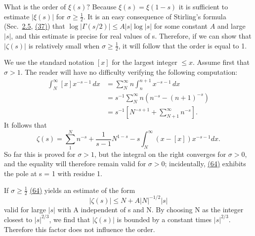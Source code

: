 What is the order of $\xi(s)?$ Because $\xi(s) = \xi(1 - s)$ it is sufficient to estimate $|\xi(s)|$ for $\sigma \geq \frac{1}{2}$. It is an easy consequence of Stirling's formula (Sec.~\hyperref[sec:5.2.5]{2.5}, \hyperref[eq:5.37]{(37)}) that $\log |\Gamma(s/2)| \leq A |s| \log |s|$ for some constant $A$ and
large $|s|$, and this estimate is precise for real values of s. Therefore, if we can show that $|\zeta(s)|$ is relatively small when $\sigma \geq \frac{1}{2}$, it will follow that the order is equal to 1.

We use the standard notation $[x]$ for the largest integer $\leq x$. Assume first that $\sigma > 1$. The reader will have no difficulty verifying the following computation:
\begin{equation*}
\begin{aligned}
\int_N^\infty[x]x^{-s-1}\,dx
&=\sum_N^\infty n\int_n^{n+1}x^{-s-1}\,dx\\
&=s^{-1}\sum_N^\infty n(n^{-s}-(n+1)^{-s})\\
&=s^{-1}\left[N^{-s+1}+\sum_{N+1}^\infty n^{-s}\right].
\end{aligned}
\end{equation*}
It follows that
\begin{equation*}
\zeta (s) = \sum_ {1} ^ {N} n ^ {- s} + \frac {1}{s - 1} N ^ {1 - s} - s \int_ {N} ^ {\infty} (x - [ x ]) x ^ {- s - 1} d x.\tag{64}\label{eq:5.64}
\end{equation*}
So far this is proved for $\sigma > 1$, but the integral on the right converges for $\sigma > 0$, and the equality will therefore remain valid for $\sigma > 0$; incidentally, \hyperref[eq:5.64]{(64)} exhibits the pole at s = 1 with residue 1.

If $\sigma \geq \frac{1}{2}$ \hyperref[eq:5.64]{(64)} yields an estimate of the form
\begin{equation*}
| \zeta (s) | \leq N + A | N | ^ {- 1 / 2} | s |
\end{equation*}
valid for large $|s|$ with A independent of s and N. By choosing N as the integer closest to $|s|^{2/3}$, we find that $|\zeta(s)|$ is bounded by a constant times $|s|^{2/3}$. Therefore this factor does not influence the order.

